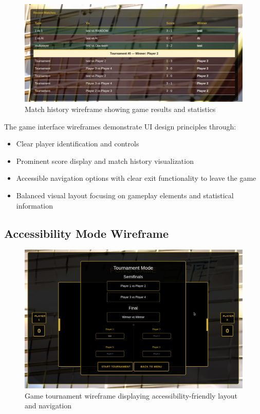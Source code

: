 \begin{figure}[H]
    \centering
    \includegraphics[width=0.7\linewidth]{Figures/images/new_images/RecentMatchesWithData.png}
    \caption{Match history wireframe showing game results and statistics}
    \label{fig:wireframe-game-results}
\end{figure}

The game interface wireframes demonstrate UI design principles through:
\begin{itemize}
    \item Clear player identification and controls
    \item Prominent score display and match history visualization
    \item Accessible navigation options with clear exit functionality to leave the game
    \item Balanced visual layout focusing on gameplay elements and statistical information
\end{itemize}

\subsection{Accessibility Mode Wireframe}

\begin{figure}[H]
    \centering
    \includegraphics[width=0.7\linewidth]{Figures/images/new_images/GameTournament.png}
    \caption{Game tournament wireframe displaying accessibility-friendly layout and navigation}
    \label{fig:wireframe-accessibility-tournament}
\end{figure}

